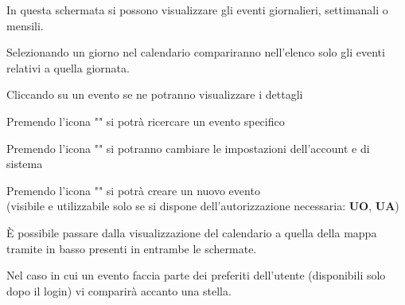 \documentclass{article}
\begin{document}
\begin{description}
\begin{center}
        \end{center}
    \item[] In questa schermata si possono visualizzare gli eventi giornalieri, settimanali o mensili.
    \item[] Selezionando un giorno nel calendario compariranno nell'elenco solo gli eventi relativi a quella giornata.
    \item[] Cliccando su un evento se ne potranno visualizzare i dettagli
    \item[] Premendo l'icona "" si potrà ricercare un evento specifico
    \item[] Premendo l'icona "" si potranno cambiare le impostazioni dell'account e di sistema
    \item[] Premendo l'icona "" si potrà creare un nuovo evento \\ (visibile e utilizzabile solo se si dispone dell'autorizzazione necessaria: \textbf{UO}, \textbf{UA})
    \item[] È possibile passare dalla visualizzazione del calendario a quella della mappa tramite in basso presenti in entrambe le schermate.
    \item[] Nel caso in cui un evento faccia parte dei preferiti dell'utente (disponibili solo dopo il login) vi comparirà accanto una stella.
\end{description}
\end{document}
